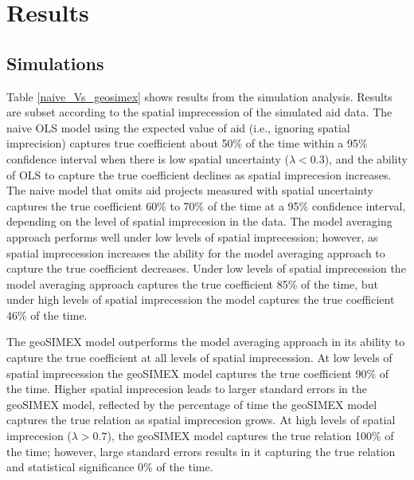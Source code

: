 \newpage

\section{Results}
\subsection{Simulations}

Table \ref{naive_Vs_geosimex} shows results from the simulation analysis. 
Results are subset according to the spatial imprecession of the simulated aid data. 
The naive OLS model using the expected value of aid (i.e., ignoring spatial imprecision) captures true coefficient about 50\% of the time within a 95\% confidence interval when there is low spatial uncertainty ($\lambda < 0.3$), and the ability of OLS to capture the true coefficient declines as spatial imprecesion increases. 
The naive model that omits aid projects measured with spatial uncertainty captures the true coefficient 60\% to 70\% of the time at a 95\% confidence interval, depending on the level of spatial imprecesion in the data. 
The model averaging approach performs well under low levels of spatial imprecession; however, as spatial imprecession increases the ability for the model averaging approach to capture the true coefficient decreases. 
Under low levels of spatial imprecession the model averaging approach captures the true coefficient 85\% of the time, but under high levels of spatial imprecession the model captures the true coefficient 46\% of the time. 
\par
The geoSIMEX model outperforms the model averaging approach in its ability to capture the true coefficient at all levels of spatial imprecession. 
At low levels of spatial imprecession the geoSIMEX model captures the true coefficient 90\% of the time. 
Higher spatial imprecesion leads to larger standard errors in the geoSIMEX model, reflected by the percentage of time the geoSIMEX model captures the true relation as spatial imprecesion grows. 
At high levels of spatial imprecesion ($\lambda > 0.7$), the geoSIMEX model captures the true relation 100\% of the time; however, large standard errors results in it capturing the true relation and statistical significance 0\% of the time.

